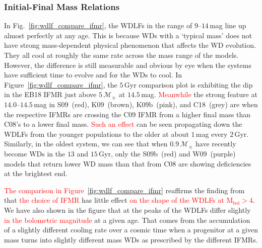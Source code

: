 \documentclass[fleqn,usenatbib]{rasti}
\newcommand{\msun}{\mathcal{M}_{\sun}}
\begin{document}
\subsubsection{Initial-Final Mass Relations}
In Fig.~\ref{fig:wdlf_compare_ifmr}, the WDLFs in the range of $9$--$14$\,mag
line up almost perfectly at any age. This is because WDs with a `typical mass'
does not have strong mass-dependent physical phenomenon that affects the WD
evolution. They all cool at roughly the same rate across the mass range of the
models. However, the difference is still measurable and obvious by eye when
the systems have sufficient time to evolve and for the WDs to cool. In 
Figure~\ref{fig:wdlf_compare_ifmr}, the $5$\,Gyr comparison plot is exhibiting
the dip in the EB18 IFMR just above $5\,\msun$ at $14.5$\,mag. \textcolor{red}{Meanwhile} the strong
feature at $14.0$--$14.5$\,mag in S09~(red), K09~(brown), K09b~(pink), and
C18~(grey) are when the respective IFMRs are crossing the C09 IFMR from a higher
final mass than C08's to a lower final mass. \textcolor{red}{Such an effect} can be seen propagating
down the WDLFs from the younger populations to the older at about $1$\,mag every
$2$\,Gyr. Similarly, in the oldest system, we can see that when $0.9\,\msun$
have recently become WDs in the $13$ and $15$\,Gyr, only the S09b~(red) and
W09~(purple) models that return lower WD mass than that from C08 are showing
deficiencies at the brightest end. 

\textcolor{red}{The comparison in Figure~\ref{fig:wdlf_compare_ifmr}} reaffirms
the finding from \citet{2008MNRAS.387.1693C} that
\textcolor{red}{the choice of IFMR} has little effect \textcolor{red}{on the
shape of the WDLFs at $\mathrm{M}_{\mathrm{bol}}>4$}.
We have also shown in the figure that at the peaks of the WDLFs differ slightly
\textcolor{red}{in the bolometric magnitude} at a given age. That comes from the
accumulation of a slightly different cooling rate over a cosmic time when a
progenitor at a given mass turns into slightly different mass WDs as prescribed
by the different IFMRs.
 
\end{document}
